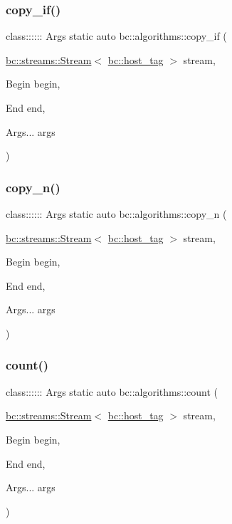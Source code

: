 \subsubsection{\texorpdfstring{copy\+\_\+if()}{copy\_if()}}
{\footnotesize\ttfamily class\+:::::: Args static auto bc\+::algorithms\+::copy\+\_\+if (\begin{DoxyParamCaption}\item[{\hyperlink{classbc_1_1streams_1_1Stream}{bc\+::streams\+::\+Stream}$<$ \hyperlink{structbc_1_1host__tag}{bc\+::host\+\_\+tag} $>$}]{stream,  }\item[{Begin}]{begin,  }\item[{End}]{end,  }\item[{Args...}]{args }\end{DoxyParamCaption})}

\mbox{\label{namespacebc_1_1algorithms_a597f05cc11712b045091b2ae51de5414}} 
\subsubsection{\texorpdfstring{copy\+\_\+n()}{copy\_n()}}
{\footnotesize\ttfamily class\+:::::: Args static auto bc\+::algorithms\+::copy\+\_\+n (\begin{DoxyParamCaption}\item[{\hyperlink{classbc_1_1streams_1_1Stream}{bc\+::streams\+::\+Stream}$<$ \hyperlink{structbc_1_1host__tag}{bc\+::host\+\_\+tag} $>$}]{stream,  }\item[{Begin}]{begin,  }\item[{End}]{end,  }\item[{Args...}]{args }\end{DoxyParamCaption})}

\mbox{\label{namespacebc_1_1algorithms_ae6f41bde30aacfe8b76975e715c52bd7}} 
\subsubsection{\texorpdfstring{count()}{count()}}
{\footnotesize\ttfamily class\+:::::: Args static auto bc\+::algorithms\+::count (\begin{DoxyParamCaption}\item[{\hyperlink{classbc_1_1streams_1_1Stream}{bc\+::streams\+::\+Stream}$<$ \hyperlink{structbc_1_1host__tag}{bc\+::host\+\_\+tag} $>$}]{stream,  }\item[{Begin}]{begin,  }\item[{End}]{end,  }\item[{Args...}]{args }\end{DoxyParamCaption})}

